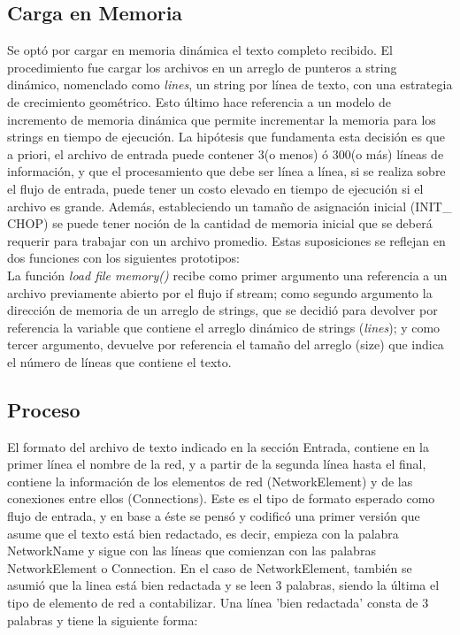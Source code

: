\documentclass[10pt,a4paper]{report}
\begin{document}
\subsection{Carga en Memoria}
Se optó por cargar en memoria dinámica el texto completo recibido. El procedimiento fue cargar los archivos en un arreglo de punteros a string dinámico, nomenclado como \textit{lines}, un string por línea de texto, con una estrategia de crecimiento geométrico. Esto último hace referencia a un modelo de incremento de memoria dinámica que permite incrementar la memoria para los strings en tiempo de ejecución. La hipótesis que fundamenta esta decisión es que a priori, el archivo de entrada puede contener 3(o menos) ó 300(o más) líneas de información, y que el procesamiento que debe ser línea a línea, si se realiza sobre el flujo de entrada, puede tener un costo elevado en tiempo de ejecución si el archivo es grande. Además, estableciendo un tamaño de asignación inicial (INIT\_ CHOP) se puede tener noción de la cantidad de memoria inicial que se deberá requerir para trabajar con un archivo promedio.
Estas suposiciones se reflejan en dos funciones con los siguientes prototipos:\\


La función \textit{load file memory()} recibe como primer argumento una referencia a un archivo previamente abierto por el flujo if stream; como segundo argumento la dirección de memoria de un arreglo de strings, que se decidió para devolver por referencia la variable que contiene el arreglo dinámico de strings (\textit{lines}); y como tercer argumento, devuelve por referencia el tamaño del arreglo (size) que indica el número de líneas que contiene el texto.

\subsection{Proceso}

El formato del archivo de texto indicado en la sección Entrada, contiene en la primer línea el nombre de la red, y a partir de la segunda línea hasta el final, contiene la información de los elementos de red (NetworkElement) y de las conexiones entre ellos (Connections). Este es el tipo de formato esperado como flujo de entrada, y en base a éste se pensó y codificó una primer versión que asume que el texto está bien redactado, es decir, empieza con la palabra NetworkName y sigue con las líneas que comienzan con las palabras NetworkElement o Connection. En el caso de NetworkElement, también se asumió que la linea está bien redactada y se leen 3 palabras, siendo la última el tipo de elemento de red a contabilizar. Una línea 'bien redactada' consta de 3 palabras y tiene la siguiente forma:\\
\end{document}

